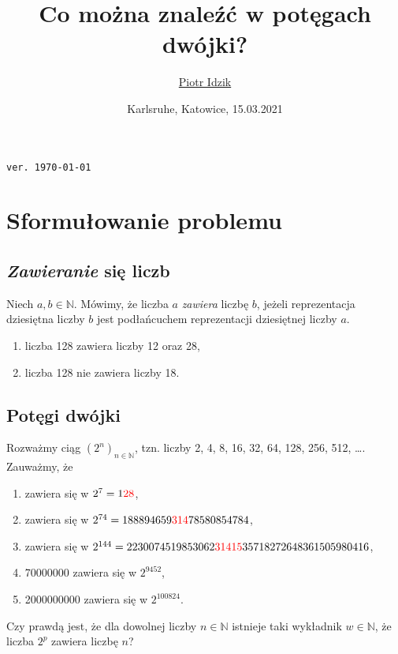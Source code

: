 \documentclass{beamer}
\author{\texorpdfstring{\href{https://www.linkedin.com/in/piotr-idzik-34b572151/}{Piotr Idzik} \\ \email{vil02@o2.pl}}{Piotr Idzik}}
\title{Co można znaleźć w potęgach dwójki?}
\date{Karlsruhe, Katowice, 15.03.2021}
\newcommand{\enumsymbol}{$\triangleright$}
\newcommand{\colora}[1]{{\color{red}{#1}}}
\newcommand{\N}{\mathbb{N}}
\newcommand{\define}[1]{\textit{#1}}
\begin{document}
\begin{frame}[plain]
\maketitle

\href{https://www.linkedin.com/in/piotr-idzik-34b572151/}{\faLinkedinSquare}
\href{https://github.com/vil02}{\faGithubSquare}
\hfill \textcolor[rgb]{0.85,0.85,0.85}{\texttt{\tiny{ver. \today\ \currenttime\/}}}
\end{frame}
\section{Sformułowanie problemu}
\subsection{\define{Zawieranie} się liczb}
\begin{frame}
  \begin{definition}
    Niech $a, b \in \N$.
    Mówimy, że liczba $a$ \define{zawiera} liczbę $b$,
    jeżeli reprezentacja dziesiętna liczby $b$ jest podłańcuchem reprezentacji dziesiętnej liczby $a$.
  \end{definition}

  \begin{example}
    \begin{enumerate}[label=\enumsymbol]
      \item liczba 128 zawiera liczby 12 oraz 28,
      \item liczba 128 nie zawiera liczby 18.
    \end{enumerate}
  \end{example}
\end{frame}
\subsection{Potęgi dwójki}
\begin{frame}
  Rozważmy ciąg $(2^n)_{n \in \N}$, tzn. liczby 2, 4, 8, 16, 32, 64, 128, 256, 512, \ldots{}.
  Zauważmy, że
  \begin{enumerate}[label=\enumsymbol]
    \item \colora{28} zawiera się w $2^7 = 1\colora{28}$,
    \item \colora{314} zawiera się w $2^{74} = 188894659\colora{314}78580854784$,
    \item \colora{31415} zawiera się w $2^{144} = 2230074519853062\colora{31415}35718272648361505980416$,
    \item 70000000 zawiera się w $2^{9452}$,
    \item 2000000000 zawiera się w $2^{100824}$.
  \end{enumerate}
  Czy prawdą jest, że dla dowolnej liczby $n \in \N$ istnieje taki wykładnik $w \in \N$, że liczba $2^p$ zawiera liczbę $n$?
\end{frame}
\end{document}
